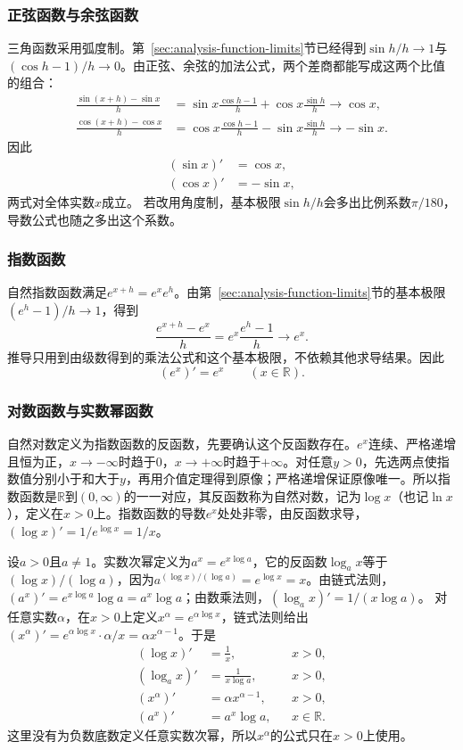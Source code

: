 \subsubsection{正弦函数与余弦函数}
三角函数采用弧度制。第~\ref{sec:analysis-function-limits}节已经得到$\sin h/h\to1$与$(\cos h-1)/h\to0$。由正弦、余弦的加法公式，两个差商都能写成这两个比值的组合：
\[
 \begin{aligned}
 \frac{\sin(x+h)-\sin x}{h}
 &=\sin x\frac{\cos h-1}{h}+\cos x\frac{\sin h}{h}
 \longrightarrow\cos x,\\
 \frac{\cos(x+h)-\cos x}{h}
 &=\cos x\frac{\cos h-1}{h}-\sin x\frac{\sin h}{h}
 \longrightarrow-\sin x.
 \end{aligned}
\]
因此
\[
 \begin{aligned}
 (\sin x)'&=\cos x,\\
 (\cos x)'&=-\sin x,
 \end{aligned}
\]
两式对全体实数$x$成立。
若改用角度制，基本极限$\sin h/h$会多出比例系数$\pi/180$，导数公式也随之多出这个系数。

\subsubsection{指数函数}
自然指数函数满足$e^{x+h}=e^xe^h$。由第~\ref{sec:analysis-function-limits}节的基本极限$(e^h-1)/h\to1$，得到
\[
 \frac{e^{x+h}-e^x}{h}=e^x\frac{e^h-1}{h}\longrightarrow e^x.
\]
推导只用到由级数得到的乘法公式和这个基本极限，不依赖其他求导结果。因此
\[
 (e^x)'=e^x\qquad(x\in\mathbb R).
\]

\subsubsection{对数函数与实数幂函数}
自然对数定义为指数函数的反函数，先要确认这个反函数存在。$e^x$连续、严格递增且恒为正，$x\to-\infty$时趋于$0$，$x\to+\infty$时趋于$+\infty$。对任意$y>0$，先选两点使指数值分别小于和大于$y$，再用介值定理得到原像；严格递增保证原像唯一。所以指数函数是$\mathbb R$到$(0,\infty)$的一一对应，其反函数称为自然对数，记为$\log x$（也记$\ln x$），定义在$x>0$上。指数函数的导数$e^x$处处非零，由反函数求导，$(\log x)'=1/e^{\log x}=1/x$。

设$a>0$且$a\neq1$。实数次幂定义为$a^x=e^{x\log a}$，它的反函数$\log_a x$等于$(\log x)/(\log a)$，因为$a^{(\log x)/(\log a)}=e^{\log x}=x$。由链式法则，$(a^x)'=e^{x\log a}\log a=a^x\log a$；由数乘法则，$(\log_a x)'=1/(x\log a)$。
对任意实数$\alpha$，在$x>0$上定义$x^\alpha=e^{\alpha\log x}$，链式法则给出$(x^\alpha)'=e^{\alpha\log x}\cdot\alpha/x=\alpha x^{\alpha-1}$。于是
\[
 \begin{aligned}
 (\log x)'&=\frac1x, &&x>0,\\
 (\log_a x)'&=\frac1{x\log a}, &&x>0,\\
 (x^\alpha)'&=\alpha x^{\alpha-1}, &&x>0,\\
 (a^x)'&=a^x\log a, &&x\in\mathbb R.
 \end{aligned}
\]
这里没有为负数底数定义任意实数次幂，所以$x^\alpha$的公式只在$x>0$上使用。

